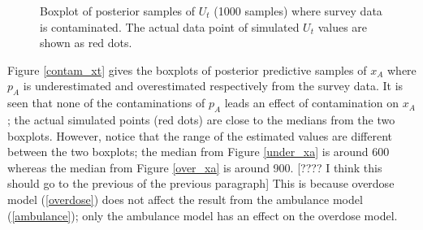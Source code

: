 \documentclass[12pt]{article}
\begin{document}
{\begin{figure}[htb]
	\centering
	\caption[two early result box plots:ut]{Boxplot of posterior samples of $U_t$ (1000 samples) where survey data is contaminated.  The actual data point of simulated $U_t$ values are shown as red dots.}
	\label{contam_ut}
\end{figure}

Figure \ref{contam_xt}  gives the boxplots of posterior predictive samples of $x_A$ where $p_A$ is underestimated and overestimated respectively from the survey data. It is seen that none of the contaminations of $p_A$ leads an effect of contamination on $x_A$; the actual simulated points (red dots) are close to the medians from the two boxplots. However, notice that the range of the estimated values are different between the two boxplots; the median from Figure \ref{under_xa} is around 600 whereas the median from Figure \ref{over_xa} is around 900. [???? I think this should go to the previous of the previous paragraph] This is because overdose model (\ref{overdose}) does not affect the result from the ambulance model (\ref{ambulance}); only the ambulance model has an effect on the overdose model.

}
\end{document}
